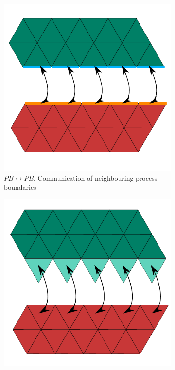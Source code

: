 \begin{figure}
    \centering
	\begin{subfigure}[b]{0.48\textwidth}
	  \includegraphics[scale=0.4]{images/parallel-comm-PBPB}
	  \captionsetup{width=0.8\textwidth} 
	  \caption{$PB \leftrightarrow PB$. Communication of neighbouring process boundaries}
	\end{subfigure}
	\begin{subfigure}[b]{0.48\textwidth}
	  \includegraphics[scale=0.4]{images/parallel-comm-IG}

\end{subfigure}
\end{figure}
